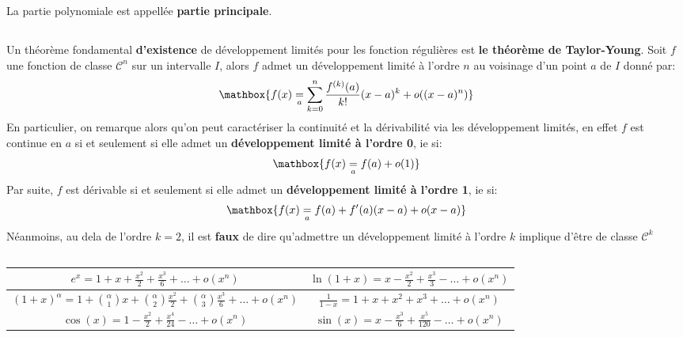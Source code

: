 La partie polynomiale est appellée \textbf{partie principale}.

\subsection*{}
Un théorème fondamental \textbf{d'existence} de développement limités pour les fonction régulières est \textbf{le théorème de Taylor-Young}.\+
Soit \(f\) une fonction de classe \(\mathscr{C}^n\) sur un intervalle \(I\), alors \(f\) admet un développement limité à l'ordre \(n\) au voisinage d'un point \(a\) de \(I\) donné par:
\[
   \mathbox{f(x) \underset{a}{=} \sum_{k=0}^{n} \frac{f^{(k)}(a)}{k!}(x - a)^k + o((x - a)^n)}   
\]
En particulier, on remarque alors qu'on peut caractériser la continuité et la dérivabilité via les développement limités, en effet \(f\) est continue en \(a\) si et seulement si elle admet un \textbf{développement limité à l'ordre 0}, ie si:
\[
   \mathbox{f(x) \underset{a}{=} f(a) + o(1)}
\]
Par suite, \(f\) est dérivable si et seulement si elle admet un \textbf{développement limité à l'ordre 1}, ie si:
\[
   \mathbox{f(x) \underset{a}{=} f(a) + f'(a)(x - a) + o(x - a)}
\]
Néanmoins, au dela de l'ordre \(k = 2\), il est \textbf{faux} de dire qu'admettre un développement limité à l'ordre \(k\) implique d'être de classe \(\mathscr{C}^k\)

\pagebreak

\subsection*{}
\begin{center}
   \renewcommand{\arraystretch}{1.5}%
   \begin{tabular}{| c | c |}
   \hline
   \(e^x = 1 + x + \frac{x^2}{2} + \frac{x^3}{6} + \ldots + o(x^n)\) & \(\ln(1 + x) = x - \frac{x^2}{2} + \frac{x^3}{3} - \ldots + o(x^n) \)\\[1.5ex]
   \hline
   \((1+x)^\alpha = 1 + \binom{\alpha}{1} x + \binom{\alpha}{2}\frac{x^2}{2} + \binom{\alpha}{3}\frac{x^3}{6} + \ldots + o(x^n)\) & \(\frac{1}{1-x} = 1 + x + x^2 + x^3 + \ldots + o(x^n)\) \\[1.5ex]
   \hline
   \(\cos(x) = 1 - \frac{x^2}{2} + \frac{x^4}{24} - \ldots + o(x^n)\) & \(\sin(x) = x - \frac{x^3}{6} + \frac{x^5}{120} - \ldots + o(x^n)\) \\[1.5ex]   
   \hline
   \end{tabular}
\end{center} 

